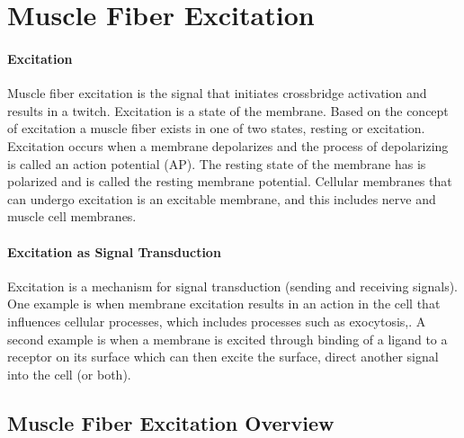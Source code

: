 \section{Muscle Fiber Excitation}
\paragraph{Excitation}
Muscle fiber excitation is the signal that initiates crossbridge activation and results in a twitch. Excitation is a state of the membrane. Based on the concept of excitation a muscle fiber exists in one of two states, resting or excitation. Excitation occurs when a membrane depolarizes and the process of depolarizing is called an action potential (AP). The resting state of the membrane has is polarized and is called the resting membrane potential. Cellular membranes that can undergo excitation is an excitable membrane, and this includes nerve and muscle cell membranes. 
\paragraph{Excitation as Signal Transduction}
Excitation is a mechanism for signal transduction (sending and receiving signals). One example is when membrane excitation results in an action in the cell that influences cellular processes, which includes processes such as exocytosis,\footnotemark{}. A second example is when a membrane is excited through binding of a ligand\footnotemark{} to a receptor on its surface which can then excite the surface, direct another signal into the cell (or both). 

\subsection{Muscle Fiber Excitation Overview}
\paragraph{}

